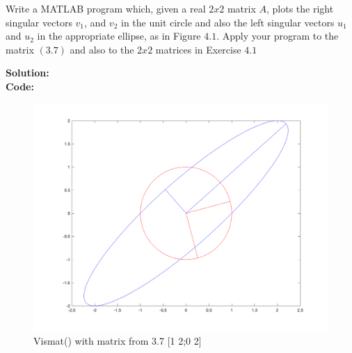 \documentclass[12pt]{article}
\makeatletter
\theoremstyle{homework}
\newenvironment{exercise}[1]
{\def\@currentlabel{#1}\exercisecore}
{\endexercisecore}
\newcommand{\localhead}[1]{\par\smallskip\noindent\textbf{#1}\nobreak\\}%
\newcommand\solution{\localhead{Solution:}}
\makeatother
\begin{document}
\begin{exercise}{4.3} Write a MATLAB program which, given a real $2x2$ matrix $A$, plots the right singular 
  vectors $v_1$, and $v_2$ in the unit circle and also the left singular vectors $u_1$ and $u_2$ in the appropriate ellipse, 
  as in Figure $4.1$. Apply your program to the matrix $(3.7)$ and also to the $2x2$ matrices in Exercise $4.1$
  \solution 
  \textbf{Code:}
          \begin{center}
            
          \end{center}

          \begin{figure}[H]
            \begin{center}
              \caption{Vismat() with matrix from 3.7 [1 2;0 2]}
              \includegraphics[width=.75\textwidth]{plot1.png}
            \end{center}
          \end{figure}


\end{exercise}
\end{document}
